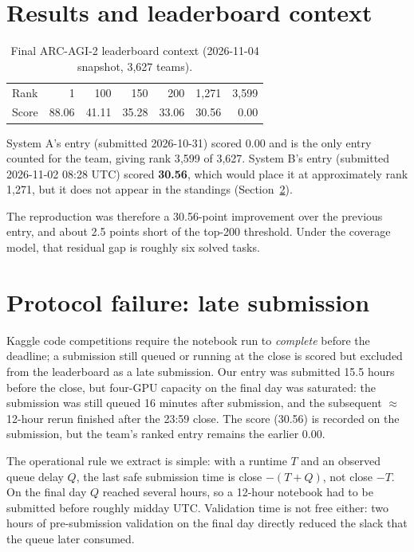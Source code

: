 \documentclass[11pt,a4paper]{article}
\begin{document}
\section{Results and leaderboard context}
\label{sec:results}

\begin{table}[h]
\centering
\caption{Final ARC-AGI-2 leaderboard context (2026-11-04 snapshot, 3{,}627 teams).}
\label{tab:lb}
\begin{tabular}{lrrrrrr}
\toprule
Rank & 1 & 100 & 150 & 200 & 1{,}271 & 3{,}599 \\
Score & 88.06 & 41.11 & 35.28 & 33.06 & 30.56 & 0.00 \\
\bottomrule
\end{tabular}
\end{table}

System A's entry (submitted 2026-10-31) scored 0.00 and is the only entry counted for the team, giving rank 3{,}599 of 3{,}627. System B's entry (submitted 2026-11-02 08:28 UTC) scored \textbf{30.56}, which would place it at approximately rank 1{,}271, but it does not appear in the standings (Section~\ref{sec:protocol}).

The reproduction was therefore a 30.56-point improvement over the previous entry, and about 2.5 points short of the top-200 threshold. Under the coverage model, that residual gap is roughly six solved tasks.

\section{Protocol failure: late submission}
\label{sec:protocol}

Kaggle code competitions require the notebook run to \emph{complete} before the deadline; a submission still queued or running at the close is scored but excluded from the leaderboard as a late submission. Our entry was submitted 15.5 hours before the close, but four-GPU capacity on the final day was saturated: the submission was still queued 16 minutes after submission, and the subsequent $\approx$12-hour rerun finished after the 23:59 close. The score (30.56) is recorded on the submission, but the team's ranked entry remains the earlier 0.00.

The operational rule we extract is simple: with a runtime $T$ and an observed queue delay $Q$, the last safe submission time is close $-(T+Q)$, not close $-T$. On the final day $Q$ reached several hours, so a 12-hour notebook had to be submitted before roughly midday UTC. Validation time is not free either: two hours of pre-submission validation on the final day directly reduced the slack that the queue later consumed.
\end{document}
